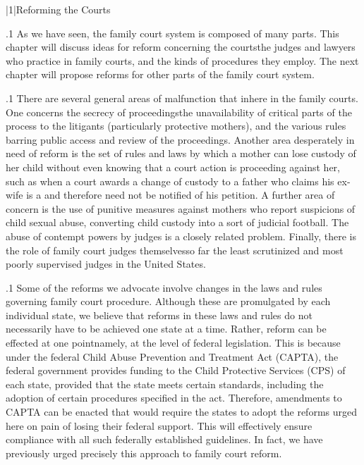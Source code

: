 \documentclass[11pt, twoside]{article}
\begin{document}
\thispagestyle{empty}

{\fontsize{13}{19}\selectfont


\hspace{-5em}\begin{minipage}{1.1\textwidth}
\begin{flushright}
{\fontsize{14}{22}\selectfont
\textbf{%
}
}
\end{flushright}
\end{minipage}


\vspace{6em}





\s|1|{Reforming the Courts}

\p.1{%
\noindent{}As we have seen, the family court system is composed of many parts.
This chapter will discuss ideas for reform concerning the courts\mdash{}the
judges and lawyers who practice in family courts, and the kinds of procedures they employ. The next chapter will propose reforms for other
parts of the family court system.
}%

\p.1{%
There are several general areas of malfunction that inhere in the family courts. One concerns the secrecy of proceedings\mdash{}the unavailability
of critical parts of the process to the litigants (particularly protective
mothers), and the various rules barring public access and review of the
proceedings. Another area desperately in need of reform is the set of
rules and laws by which a mother can lose custody of her child without even knowing that a court action is proceeding against her, such
as when a court awards a change of custody to a father who claims his
ex-wife is a  and therefore need not be notified of his petition. A further area of concern is the use of punitive measures against
mothers who report suspicions of child sexual abuse, converting child
custody into a sort of judicial football. The abuse of contempt powers
by judges is a closely related problem. Finally, there is the role of family
court judges themselves\mdash{}so far the least scrutinized and most poorly
supervised judges in the United States.
}%

\p.1{%
Some of the reforms we advocate involve changes in the laws and rules
governing family court procedure. Although these are promulgated by
each individual state, we believe that reforms in these laws and rules do
not necessarily have to be achieved one state at a time. Rather, reform
can be effected at one point\mdash{}namely, at the level of federal legislation.
This is because under the federal
Child Abuse Prevention and Treatment Act (CAPTA), the
federal government provides funding to the
Child Protective Services (CPS) of each state, provided that the state
meets certain standards, including the adoption of certain procedures
specified in the act. Therefore, amendments to CAPTA can be enacted
that would require the states to adopt the reforms urged here on pain
of losing their federal support. This will effectively ensure compliance
with all such federally established guidelines. In fact, we have previously
urged precisely this approach to family court reform.
}%


}
\end{document}

